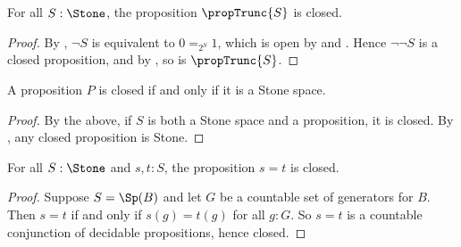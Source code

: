 \begin{corollary}\label{TruncationStoneClosed}
  For all $S:\Stone$, the proposition $\propTrunc{S}$ is closed. 
\end{corollary}
\begin{proof}
  By , $\neg S$ is equivalent to $0=_{2^S} 1$, which is open by  and . 
  Hence $\neg \neg S$ is a closed proposition, and by , so is $\propTrunc{S}$. 
\end{proof}


\begin{corollary}\label{PropositionsClosedIffStone}
  A proposition $P$ is closed if and only if it is a Stone space. 
\end{corollary}
\begin{proof}
  By the above, if $S$ is both a Stone space and a proposition, it is closed. 
  By , any closed proposition is Stone. 
\end{proof}

\begin{lemma}\label{StoneEqualityClosed}
For all $S:\Stone$ and $s,t:S$, the proposition $s=t$ is closed. 
\end{lemma}
\begin{proof}
  Suppose $S= \Sp(B)$ and let $G$ be a countable set of generators for $B$. 
  Then $s=t$ if and only if $s(g) = t(g)$ for all $g:G$. 
  So $s=t$ is a countable conjunction of decidable propositions, hence 
  closed.
\end{proof}
